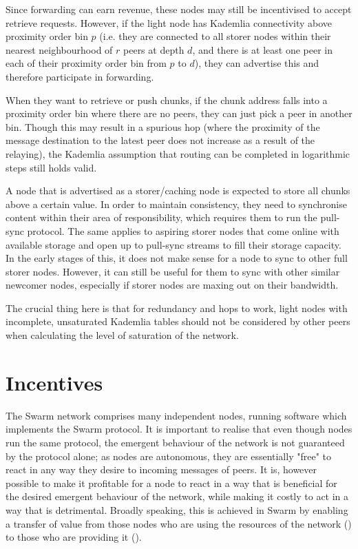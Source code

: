 Since forwarding can earn revenue, these nodes may still be incentivised to accept retrieve requests. However, if the light node has Kademlia connectivity above proximity order bin $p$ (i.e. they  are connected to all storer nodes within their nearest neighbourhood of $r$ peers at depth $d$, and there is at least one peer in each of their proximity order bin from $p$ to $d$), they can advertise this and therefore participate in forwarding. 

When they want to retrieve or push chunks, if the chunk address falls into a proximity order bin where there are no peers, they can just pick a  peer in another bin. Though this may result in a spurious hop (where the proximity of the message  destination to the latest peer does not increase as a result of the relaying), the Kademlia assumption that routing can be completed in logarithmic steps still holds valid.

A node that is advertised as a storer/caching node is expected to store all chunks  above a certain value. In order to maintain consistency, they need to synchronise content within their area of responsibility, which requires them to run the pull-sync protocol. The same applies to aspiring storer nodes that come online with available storage and open up to pull-sync streams to fill their storage capacity. In the early stages of this, it does not make sense for a node to sync to other full storer nodes. However, it can still be useful for them to sync with other similar newcomer nodes, especially if storer nodes are maxing out on their bandwidth.

The crucial thing here is that for redundancy and hops to work, light nodes with incomplete, unsaturated Kademlia tables should not be considered by other peers when calculating the level of saturation of the network.


\chapter{Incentives}\label{sec:incentivisation}
The Swarm network comprises many independent nodes, running software which implements the Swarm protocol. It is important to realise that even though nodes run the same protocol, the emergent behaviour of the network is not guaranteed by the protocol alone; as nodes are autonomous, they are essentially "free" to react in any way they desire to incoming messages of peers.
It is, however possible to make it profitable for a node to react in a way that is beneficial for the desired emergent behaviour of the network, while making it costly to act in a way that is detrimental. Broadly speaking, this is achieved in Swarm by enabling a transfer of value from those nodes who are using the resources of the network () to those who are providing it (). 


